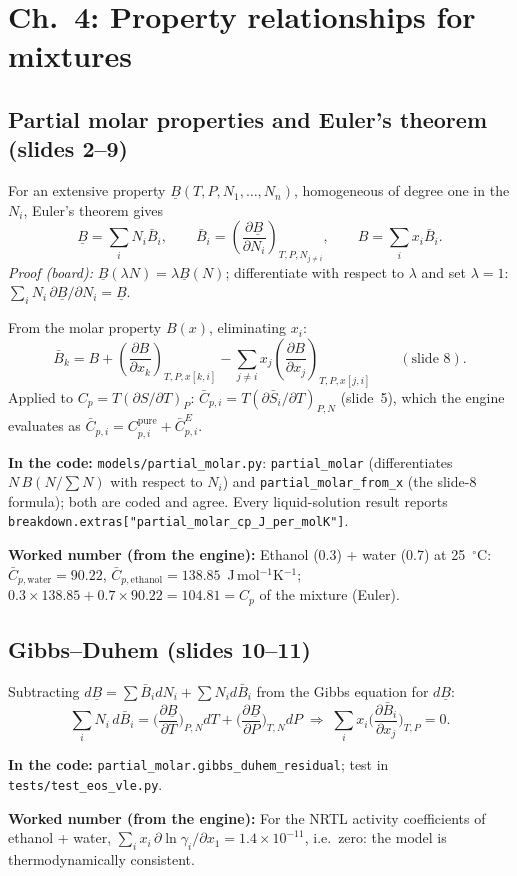 \documentclass[11pt,a4paper]{article}
\newcommand{\code}[1]{\texttt{\small #1}}
\newcommand{\where}[1]{\par\noindent\textbf{In the code:} #1\par}
\newcommand{\num}[1]{\par\noindent\textbf{Worked number (from the engine):} #1\par}
\begin{document}
\section{Ch.~4: Property relationships for mixtures}

\subsection{Partial molar properties and Euler's theorem (slides 2--9)}
For an extensive property $\underline{B}(T,P,N_1,\dots,N_n)$, homogeneous of degree one in the $N_i$,
Euler's theorem gives
\[
\underline B=\sum_i N_i\bar B_i,\qquad \bar B_i=\left(\frac{\partial\underline B}{\partial N_i}\right)_{T,P,N_{j\neq i}},
\qquad B=\sum_i x_i\bar B_i .
\]
\emph{Proof (board):} $\underline B(\lambda N)=\lambda\underline B(N)$; differentiate with respect to
$\lambda$ and set $\lambda=1$: $\sum_i N_i\,\partial\underline B/\partial N_i=\underline B$.

From the molar property $B(x)$, eliminating $x_i$:
\[
\bar B_k=B+\left(\frac{\partial B}{\partial x_k}\right)_{T,P,x[k,i]}-\sum_{j\neq i}x_j\left(\frac{\partial
B}{\partial x_j}\right)_{T,P,x[j,i]} \qquad(\text{slide 8}).
\]
Applied to $C_p=T(\partial S/\partial T)_P$: $\bar C_{p,i}=T(\partial\bar S_i/\partial T)_{P,N}$
(slide~5), which the engine evaluates as $\bar C_{p,i}=C_{p,i}^{\text{pure}}+\bar C_{p,i}^{E}$.
\where{\code{models/partial\_molar.py}: \code{partial\_molar} (differentiates $N\,B(N/\sum N)$ with respect
to $N_i$) and \code{partial\_molar\_from\_x} (the slide-8 formula); both are coded and agree.
Every liquid-solution result reports \code{breakdown.extras["partial\_molar\_cp\_J\_per\_molK"]}.}
\num{Ethanol (0.3) + water (0.7) at 25~$^\circ$C: $\bar C_{p,\mathrm{water}}=90.22$,
$\bar C_{p,\mathrm{ethanol}}=138.85$~J\,mol$^{-1}$K$^{-1}$;
$0.3\times138.85+0.7\times90.22=104.81=C_p$ of the mixture (Euler).}

\subsection{Gibbs--Duhem (slides 10--11)}
Subtracting $d\underline B=\sum\bar B_i dN_i+\sum N_i d\bar B_i$ from the Gibbs equation for $d\underline B$:
\[
\sum_i N_i\,d\bar B_i=\Big(\frac{\partial\underline B}{\partial T}\Big)_{P,N}dT+\Big(\frac{\partial\underline
B}{\partial P}\Big)_{T,N}dP
\;\Rightarrow\;\sum_i x_i\Big(\frac{\partial\bar B_i}{\partial x_j}\Big)_{T,P}=0 .
\]
\where{\code{partial\_molar.gibbs\_duhem\_residual}; test in \code{tests/test\_eos\_vle.py}.}
\num{For the NRTL activity coefficients of ethanol + water, $\sum_i x_i\,\partial\ln\gamma_i/\partial x_1
=1.4\times10^{-11}$, i.e.\ zero: the model is thermodynamically consistent.}
\end{document}
